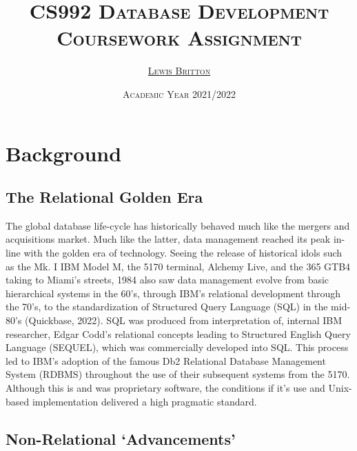 \documentclass[11pt, english]{article}
\begin{document}

	\title{\textsc{CS992 Database Development\\ Coursework Assignment}}
	\author{\textsc{\href{http://lewisbritton.com/}{Lewis Britton}}}
	\date{\textsc{Academic Year 2021/2022}}
        \maketitle

\newpage


	\renewcommand{\contentsname}{Table of Contents}

	\tableofcontents

\newpage


\section{Background}

	\subsection{The Relational Golden Era}

	The global database life-cycle has historically behaved much like the mergers and acquisitions market. Much like the latter, data management reached its peak in-line with the golden era of technology. Seeing the release of historical idols such as the Mk. I IBM Model M, the 5170 terminal, Alchemy Live, and the 365 GTB4 taking to Miami's streets, 1984 also saw data management evolve from basic hierarchical systems in the 60's, through IBM's relational development through the 70's, to the standardization of Structured Query Language (SQL) in the mid-80's (Quickbase, 2022). SQL was produced from interpretation of, internal IBM researcher, Edgar Codd's relational concepts leading to Structured English Query Language (SEQUEL), which was commercially developed into SQL. This process led to IBM's adoption of the famous Db2 Relational Database Management System (RDBMS) throughout the use of their subsequent systems from the 5170. Although this is and was proprietary software, the conditions if it's use and Unix-based implementation delivered a high pragmatic standard.

	\subsection{Non-Relational `Advancements'}
\end{document}
